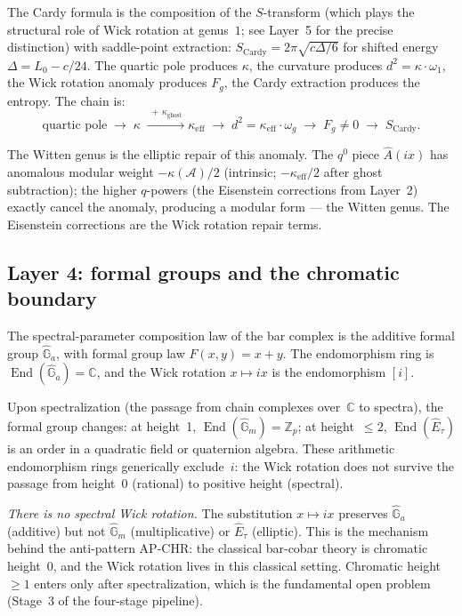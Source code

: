 \documentclass[11pt]{article}
\newcommand{\cA}{\mathcal{A}}
\newcommand{\C}{\mathbb{C}}
\newcommand{\Z}{\mathbb{Z}}
\newcommand{\End}{\operatorname{End}}
\begin{document}
The Cardy formula is the composition of the $S$-transform
(which plays the structural role of Wick rotation at genus~$1$;
see Layer~5 for the precise distinction) with saddle-point extraction:
$S_{\mathrm{Cardy}} = 2\pi\sqrt{c\Delta/6}$ for shifted energy
$\Delta=L_0-c/24$.  The quartic pole
produces $\kappa$, the curvature produces $d^2 = \kappa \cdot \omega_1$,
the Wick rotation anomaly produces $F_g$, the Cardy extraction
produces the entropy.  The chain is:
\[
\text{quartic pole}
\;\longrightarrow\;
\kappa
\;\xrightarrow{\;+\,\kappa_{\mathrm{ghost}}\;}
\kappa_{\mathrm{eff}}
\;\longrightarrow\;
d^2 = \kappa_{\mathrm{eff}} \cdot \omega_g
\;\longrightarrow\;
F_g \ne 0
\;\longrightarrow\;
S_{\mathrm{Cardy}}.
\]

The Witten genus is the elliptic repair of this anomaly.
The $q^0$ piece $\hat{A}(ix)$ has anomalous modular weight
$-\kappa(\cA)/2$ (intrinsic; $-\kappa_{\mathrm{eff}}/2$ after
ghost subtraction); the higher $q$-powers (the Eisenstein corrections
from Layer~2) exactly cancel the anomaly, producing a
modular form --- the Witten genus.  The Eisenstein corrections
are the Wick rotation repair terms.

\subsection{Layer 4: formal groups and the chromatic boundary}

The spectral-parameter composition law of the bar complex is
the additive formal group $\hat{\mathbb{G}}_a$, with formal
group law $F(x,y) = x + y$.  The endomorphism ring is
$\End(\hat{\mathbb{G}}_a) = \C$, and the Wick rotation
$x \mapsto ix$ is the endomorphism $[i]$.

Upon spectralization (the passage from chain complexes over~$\C$
to spectra), the formal group changes:
at height~1, $\End(\hat{\mathbb{G}}_m) = \Z_p$;
at height~$\le 2$, $\End(\hat{E}_\tau)$ is an order in a
quadratic field or quaternion algebra.  These arithmetic
endomorphism rings generically exclude~$i$:
the Wick rotation does not survive the passage from
height~$0$ (rational) to positive height (spectral).

\emph{There is no spectral Wick rotation.}  The substitution
$x \mapsto ix$ preserves $\hat{\mathbb{G}}_a$ (additive) but not
$\hat{\mathbb{G}}_m$ (multiplicative) or $\hat{E}_\tau$ (elliptic).
This is the mechanism behind the anti-pattern AP-CHR: the classical
bar-cobar theory is chromatic height~$0$, and the Wick rotation lives
in this classical setting.  Chromatic height~$\ge 1$ enters only after
spectralization, which is the fundamental open problem (Stage~3 of
the four-stage pipeline).
\end{document}
